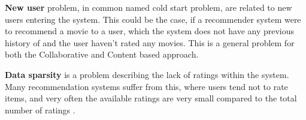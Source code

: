 \textbf{New user} problem, in common named cold start problem, are related to new users entering the system. This could be the case, if a recommender system were to recommend a movie to a user, which the system does not have any previous history of and the user haven't rated any movies. This is a general problem for both the Collaborative and Content based approach. \newline

\textbf{Data sparsity} is a problem describing the lack of ratings within the system. Many recommendation systems suffer from this, where users tend not to rate items, and very often the available ratings are very small compared to the total number of ratings \citep[p. 19]{TowardsTheNextGenerationOfRs}. 

\newpage